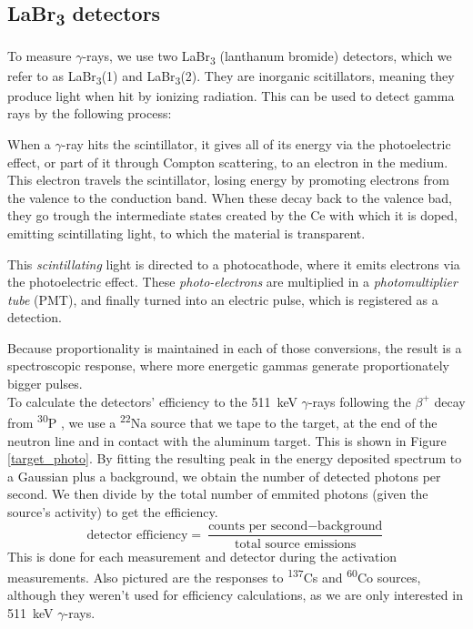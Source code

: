 \documentclass[a4paper,12pt]{report}
\newcommand{\Piso}{\textsuperscript{30}P }
\newcommand{\Na}{\textsuperscript{22}Na }
\begin{document}
\subsection{LaBr\textsubscript{3} detectors}
To measure $\gamma$-rays, we use two LaBr\textsubscript{3} (lanthanum bromide) detectors, which we refer to as LaBr\textsubscript{3}(1) and LaBr\textsubscript{3}(2).
They are inorganic scitillators, meaning they produce light when hit by ionizing radiation.
This can be used to detect gamma rays by the following process:

When a $\gamma$-ray hits the scintillator, it gives all of its energy via the photoelectric effect, or part of it through Compton scattering, to an electron in the medium.
This electron travels the scintillator, losing energy by promoting electrons from the valence to the conduction band.
When these decay back to the valence bad, they go trough the intermediate states created by the Ce with which it is doped, emitting scintillating light, to which the material is transparent.

This \textit{scintillating} light is directed to a photocathode, where it emits electrons via the photoelectric effect.
These \textit{photo-electrons} are multiplied in a \textit{photomultiplier tube} (PMT), and finally turned into an electric pulse, which is registered as a detection.

Because proportionality is maintained in each of those conversions, the result is a spectroscopic response, where more energetic gammas generate proportionately bigger pulses.\cite{labr}
\\

To calculate the detectors' efficiency to the \qty{511}{\keV} $\gamma$-rays following the $\beta^+$ decay from \Piso, we use a \Na source that we tape to the target, at the end of the neutron line and in contact with the aluminum target.
This is shown in Figure \ref{target_photo}.
By fitting the resulting peak in the energy deposited spectrum to a Gaussian plus a background, we obtain the number of detected photons per second.
We then divide by the total number of emmited photons (given the source's activity) to get the efficiency.
\begin{equation}
	\text{detector efficiency} = \frac{\text{counts per second}-\text{background}}{\text{total source emissions}}
\end{equation}
This is done for each measurement and detector during the activation measurements.
Also pictured are the responses to \textsuperscript{137}Cs and \textsuperscript{60}Co sources, although they weren't used for efficiency calculations, as we are only interested in \qty{511}{\keV} $\gamma$-rays.
\end{document}
